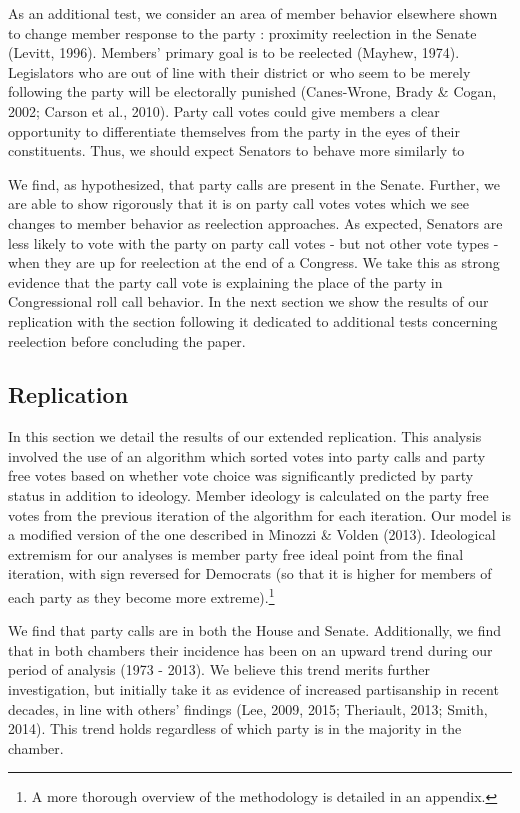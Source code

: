 \documentclass[12pt]{article}
\begin{document}
As an additional test, we consider an area of member behavior elsewhere shown to change member response to the party : proximity reelection in the Senate (Levitt, 1996). Members' primary goal is to be reelected (Mayhew, 1974). Legislators who are out of line with their district or who seem to be merely following the party will be electorally punished (Canes-Wrone, Brady \& Cogan, 2002; Carson et al., 2010). Party call votes could give members a clear opportunity to differentiate themselves from the party in the eyes of their constituents. Thus, we should expect Senators to behave more similarly to 

We find, as hypothesized, that party calls are present in the Senate. Further, we are able to show rigorously that it is on party call votes votes which we see changes to member behavior as reelection approaches. As expected, Senators are less likely to vote with the party on party call votes - but not other vote types - when they are up for reelection at the end of a Congress. We take this as strong evidence that the party call vote is explaining the place of the party in Congressional roll call behavior. In the next section we show the results of our replication with the section following it dedicated to additional tests concerning reelection before concluding the paper.

\subsection{Replication}

In this section we detail the results of our extended replication. This analysis involved the use of an algorithm which sorted votes into party calls and party free votes based on whether vote choice was significantly predicted by party status in addition to ideology. Member ideology is calculated on the party free votes from the previous iteration of the algorithm for each iteration. Our model is a modified version of the one described in Minozzi \& Volden (2013). Ideological extremism for our analyses is member party free ideal point from the final iteration, with sign reversed for Democrats (so that it is higher for members of each party as they become more extreme).\footnote{A more thorough overview of the methodology is detailed in an appendix.}

We find that party calls are in both the House and Senate. Additionally, we find that in both chambers their incidence has been on an upward trend during our period of analysis (1973 - 2013). We believe this trend merits further investigation, but initially take it as evidence of increased partisanship in recent decades, in line with others' findings (Lee, 2009, 2015; Theriault, 2013; Smith, 2014). This trend holds regardless of which party is in the majority in the chamber.
\end{document}
